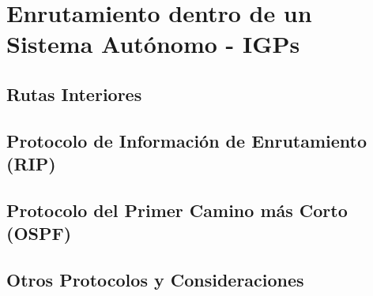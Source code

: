 \documentclass[12pts, a4paper]{book}
\begin{document}
	\chapter{Enrutamiento dentro de un Sistema Autónomo - IGPs}	
		\section{Rutas Interiores}
		
		
		\section{Protocolo de Información de Enrutamiento (RIP)}
		
		
		\section{Protocolo del Primer Camino más Corto (OSPF)}
		
		
		\section{Otros Protocolos y Consideraciones}
		
\end{document}
